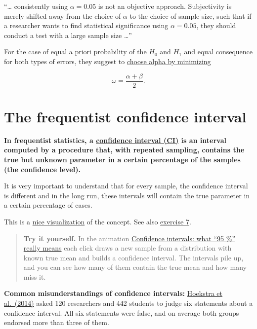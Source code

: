 \documentclass[
]{book}
\begin{document}
``\ldots{} consistently using \(\alpha = 0.05\) is not an objective approach. Subjectivity is
merely shifted away from the choice of \(\alpha\) to the choice of sample size, such
that if a researcher wants to find statistical significance using \(\alpha = 0.05\),
they should conduct a test with a large sample size \ldots{}''

For the case of equal a priori probability of the \(H_0\) and \(H_1\) and equal consequence
for both types of errors, they suggest to \href{https://journals.plos.org/plosone/article/figure?id=10.1371/journal.pone.0032734.g002}{choose alpha by minimizing}

\[\omega = \frac{\alpha + \beta}{2}.\]

\section{The frequentist confidence interval}\label{the-frequentist-confidence-interval}

\textbf{In frequentist statistics, a \href{https://en.wikipedia.org/wiki/Confidence_interval}{confidence interval (CI)} is an interval computed by a procedure that, with repeated sampling,
contains the true but unknown parameter in a certain percentage of the samples (the confidence level).}

It is very important to understand that for every sample, the confidence interval is different and in the long run,
these intervals will contain the true parameter in a certain percentage of cases.

This is a \href{https://en.wikipedia.org/wiki/Confidence_interval\#/media/File:Normal_distribution_50\%25_CI_illustration.svg}{nice visualization}
of the concept.
See also \hyperref[exercise7_nhst]{exercise 7}.

\begin{quote}
\textbf{Try it yourself.} In the animation
\href{https://jdegenfellner.github.io/Script_QM1_ZHAW/animations/16_Konfidenzintervalle_frequentistisch.html}{Confidence intervals: what ``95 \%'' really means}
each click draws a new sample from a distribution with known true mean and builds a confidence interval.
The intervals pile up, and you can see how many of them contain the true mean and how many miss it.
\end{quote}

\textbf{Common misunderstandings of confidence intervals:}
\href{https://doi.org/10.3758/s13423-013-0572-3}{Hoekstra et al.~(2014)} asked 120 researchers and 442 students to judge
six statements about a confidence interval. All six statements were false, and on average both groups
endorsed more than three of them.
\end{document}
